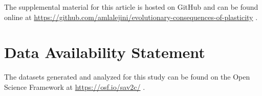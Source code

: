 The supplemental material for this article is hosted on GitHub and can be found online at \url{https://github.com/amlalejini/evolutionary-consequences-of-plasticity} \citep{supplemental_material}.

\section*{Data Availability Statement}

The datasets generated and analyzed for this study can be found on the Open Science Framework at \url{https://osf.io/sav2c/} \citep{osf_data}.